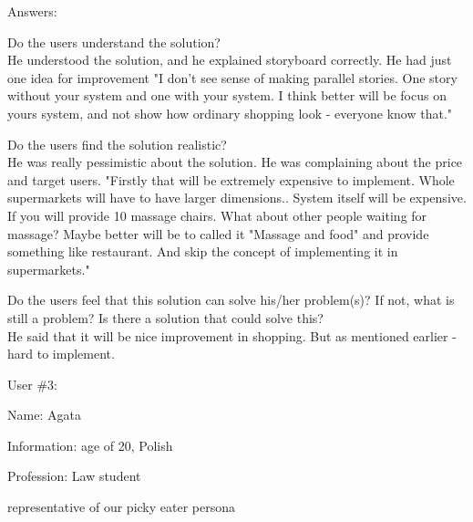 \documentclass[a4paper,10pt,oneside]{scrreprt}
\begin{document}
Answers:
\begin{compactitem}
	\item Do the users understand the solution?\\
	He understood the solution, and he explained storyboard correctly. He had just one idea for improvement "I don't see sense of making
parallel stories. One story without your system and one with your system. I think better will be focus on yours system, and not show how ordinary shopping look - everyone know that."\\
	
	\item Do the users find the solution realistic?\\
	He was really pessimistic about the solution. He was complaining about the price and target users. "Firstly that will be extremely expensive to implement. Whole supermarkets will have to have 
larger dimensions.. System itself will be expensive. If you will provide 10 massage chairs. What about other people waiting for massage? Maybe better will be to called it "Massage and food" and provide something like restaurant. And skip the concept of implementing it in supermarkets."\\
	
	\item Do the users feel that this solution can solve his/her problem(s)? If not, what is still
	a problem? Is there a solution that could solve this?\\
	He said that it will be nice improvement in shopping. But as mentioned earlier - hard to implement. \\
\end{compactitem}
\bigskip

User \#3:
\begin{compactitem}
	\item Name: Agata
	\item Information: age of 20, Polish
	\item Profession: Law student
	\item representative of our picky eater persona
\end{compactitem}
\bigskip
\end{document}
